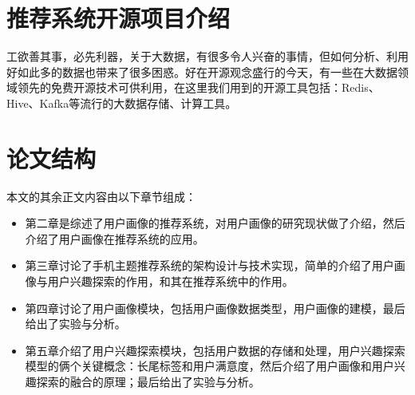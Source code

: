 \section{推荐系统开源项目介绍}
工欲善其事，必先利器，关于大数据，有很多令人兴奋的事情，但如何分析、利用好如此多的数据也带来了很多困惑。好在开源观念盛行的今天，有一些在大数据领域领先的免费开源技术可供利用，在这里我们用到的开源工具包括：Redis、Hive、Kafka等流行的大数据存储、计算工具。

\section{论文结构}
	本文的其余正文内容由以下章节组成：
	\begin{itemize}

	\item 第二章是综述了用户画像的推荐系统，对用户画像的研究现状做了介绍，然后介绍了用户画像在推荐系统的应用。
	\item 第三章讨论了手机主题推荐系统的架构设计与技术实现，简单的介绍了用户画像与用户兴趣探索的作用，和其在推荐系统中的作用。
	\item 第四章讨论了用户画像模块，包括用户画像数据类型，用户画像的建模，最后给出了实验与分析。
	\item 第五章介绍了用户兴趣探索模块，包括用户数据的存储和处理，用户兴趣探索模型的俩个关键概念：长尾标签和用户满意度，然后介绍了用户画像和用户兴趣探索的融合的原理；最后给出了实验与分析。
	\end{itemize}